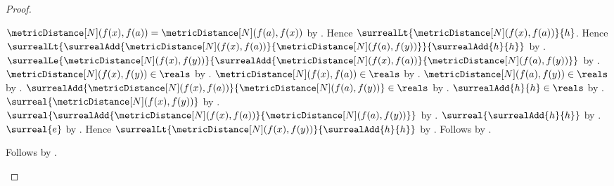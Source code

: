 \begin{proof}
\begin{subproof}
\begin{byCase}
\begin{subproof}
                $\metricDistance[N](f(x),f(a))
                    =\metricDistance[N](f(a),f(x))$ by
                    .
                Hence $\surrealLt{\metricDistance[N](f(x),f(a))}{h}$.
                Hence $\surrealLt{
                    \surrealAdd{\metricDistance[N](f(x),f(a))}
                        {\metricDistance[N](f(a),f(y))}}
                    {\surrealAdd{h}{h}}$ by
                    .
                $\surrealLe{\metricDistance[N](f(x),f(y))}{
                    \surrealAdd{\metricDistance[N](f(x),f(a))}
                        {\metricDistance[N](f(a),f(y))}}$ by
                    .
                $\metricDistance[N](f(x),f(y))\in\reals$ by
                    .
                $\metricDistance[N](f(x),f(a))\in\reals$ by
                    .
                $\metricDistance[N](f(a),f(y))\in\reals$ by
                    .
                $\surrealAdd{\metricDistance[N](f(x),f(a))}
                    {\metricDistance[N](f(a),f(y))}\in\reals$ by
                    .
                $\surrealAdd{h}{h}\in\reals$ by
                    .
                $\surreal{\metricDistance[N](f(x),f(y))}$ by
                    .
                $\surreal{\surrealAdd{\metricDistance[N](f(x),f(a))}
                    {\metricDistance[N](f(a),f(y))}}$ by
                    .
                $\surreal{\surrealAdd{h}{h}}$ by
                    .
                $\surreal{e}$ by
                    .
                Hence $\surrealLt{\metricDistance[N](f(x),f(y))}
                    {\surrealAdd{h}{h}}$ by
                    .
                Follows by .
            \end{subproof}
            Follows by \auto.
        \end{byCase}
    \end{subproof}
\end{proof}
